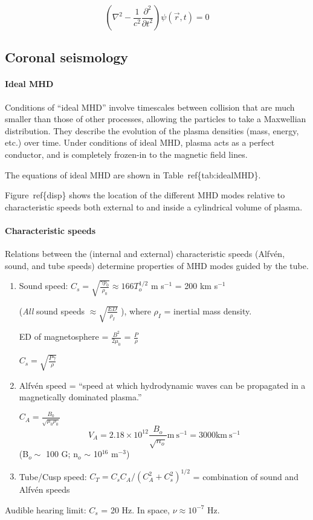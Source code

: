 \[
    \left( \nabla^{2} - \frac{1}{c^{2}} \frac{\partial^{2}}{\partial t^{2}} \right)
    \psi\left( \vec{r},t \right)
    = 0
    \]

\subsection{Coronal seismology}\label{cs}

\paragraph{Ideal MHD}\label{idealMHD}
Conditions of ``ideal MHD'' involve timescales between collision that are much
smaller than those of other processes, allowing the particles to take a
Maxwellian distribution. They describe the evolution of the plasma densities
(mass, energy, etc.) over time. Under conditions of ideal MHD, plasma acts as a
perfect conductor, and is completely frozen-in to the magnetic field lines.

The equations of ideal MHD are shown in Table~ref\{tab:idealMHD\}.
\

Figure~ref\{disp\} shows the location of the different MHD modes relative to
characteristic speeds both external to and inside a cylindrical volume of
plasma.

\paragraph{Characteristic speeds}
Relations between the (internal and external)
characteristic speeds (Alfv\'en, sound, and tube speeds)
determine properties of MHD modes guided by the tube.

\begin{enumerate}
    \item Sound speed: $C_{s} = \sqrt{\frac{\gamma p_{0}}{\rho_{0}}}
            \approx 166 T_{o}^{1/2}$ m s$^{-1}$ = 200 km s$^{-1}$

            (\emph{All} sound speeds $\approx \sqrt{ \frac{ED}{\rho_{I}} } $ ),
            where $\rho_{I}$ = inertial mass density.

            ED of magnetosphere = $\frac{B^{2}}{2\mu_{0}} $
            = $\frac{P}{\rho} $

            $C_{s} = \sqrt{ \frac{P\gamma}{\rho}  } $

    \item Alfv\'en speed = ``speed at which hydrodynamic waves can be propagated
    in a magnetically dominated plasma.''

        $C_{A} = \frac{B_{0}}{\sqrt{\mu_{0}\rho_{0}}}$
        \[
            V_{A} = 2.18\times10^{12}\frac{B_o}{\sqrt{n_o}}
            \textrm{m}\ \textrm{s}^{-1} = 3000 \textrm{km}\ \textrm{s}^{-1}
            \]
        (B$_{o} \sim$ 100 G; n$_{o}$ $\sim$ 10$^{16}$ m$^{-3}$)
    \item Tube/Cusp speed:
        $C_{T} = C_{s}C_{A}/\left(C_{A}^{2} + C_{s}^{2}\right)^{1/2}$
        = combination of sound and Alfv\'en speeds
\end{enumerate}
Audible hearing limit: $C_{s}$ = 20 Hz. In space, $\nu \approx 10^{-7}$ Hz.


